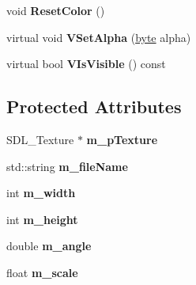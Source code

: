 \begin{DoxyCompactItemize}
\item 
\hypertarget{classGfxImage_a32a5d42b4d52cfa74167b5e8553abeda}{void {\bfseries Reset\-Color} ()}\label{classGfxImage_a32a5d42b4d52cfa74167b5e8553abeda}

\item 
\hypertarget{classGfxImage_a057ee1c70d53831b1b32b1bf885a1eae}{virtual void {\bfseries V\-Set\-Alpha} (\hyperlink{GameStd_8h_a0c8186d9b9b7880309c27230bbb5e69d}{byte} alpha)}\label{classGfxImage_a057ee1c70d53831b1b32b1bf885a1eae}

\item 
\hypertarget{classGfxImage_a16105445de1289b5ffa860cf478953e4}{virtual bool {\bfseries V\-Is\-Visible} () const }\label{classGfxImage_a16105445de1289b5ffa860cf478953e4}

\end{DoxyCompactItemize}
\subsection*{Protected Attributes}
\begin{DoxyCompactItemize}
\item 
\hypertarget{classGfxImage_a61075f70a846e953f3afd6a680e02bae}{S\-D\-L\-\_\-\-Texture $\ast$ {\bfseries m\-\_\-p\-Texture}}\label{classGfxImage_a61075f70a846e953f3afd6a680e02bae}

\item 
\hypertarget{classGfxImage_a042aeda1366ed533b2ccb3ab94e8f3dd}{std\-::string {\bfseries m\-\_\-file\-Name}}\label{classGfxImage_a042aeda1366ed533b2ccb3ab94e8f3dd}

\item 
\hypertarget{classGfxImage_a619f08ff1eeac75dd923bc93892f1a6c}{int {\bfseries m\-\_\-width}}\label{classGfxImage_a619f08ff1eeac75dd923bc93892f1a6c}

\item 
\hypertarget{classGfxImage_afa1a73cd040b191d15c8b312d13da2e3}{int {\bfseries m\-\_\-height}}\label{classGfxImage_afa1a73cd040b191d15c8b312d13da2e3}

\item 
\hypertarget{classGfxImage_ac904ba078ce4fb28cc2641bb615775a0}{double {\bfseries m\-\_\-angle}}\label{classGfxImage_ac904ba078ce4fb28cc2641bb615775a0}

\item 
\hypertarget{classGfxImage_a5f6d1dc53013152f9e09004dbdd57aab}{float {\bfseries m\-\_\-scale}}\label{classGfxImage_a5f6d1dc53013152f9e09004dbdd57aab}

\end{DoxyCompactItemize}


